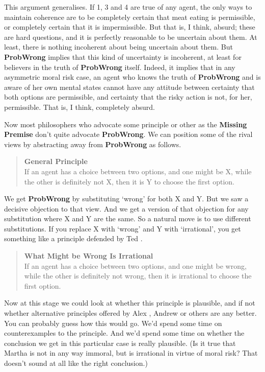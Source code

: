 This argument generalises. If 1, 3 and 4 are true of any agent, the only ways to maintain coherence are to be completely certain that meat eating is permissible, or completely certain that it is impermissible. But that is, I think, absurd; these are hard questions, and it is perfectly reasonable to be uncertain about them. At least, there is nothing incoherent about being uncertain about them. But \textbf{ProbWrong} implies that this kind of uncertainty is incoherent, at least for believers in the truth of \textbf{ProbWrong} itself. Indeed, it implies that in any asymmetric moral risk case, an agent who knows the truth of \textbf{ProbWrong} and is aware of her own mental states cannot have any attitude between certainty that both options are permissible, and certainty that the risky action is not, for her, permissible. That is, I think, completely absurd.

Now most philosophers who advocate some principle or other as the \textbf{Missing Premise} don't quite advocate \textbf{ProbWrong}. We can position some of the rival views by abstracting away from \textbf{ProbWrong} as follows.

\begin{quote}

\textbf{General Principle}\\
If an agent has a choice between two options, and one might be X, while the other is definitely not X, then it is Y to choose the first option.
\end{quote}
We get \textbf{ProbWrong} by substituting `wrong' for both X and Y. But we saw a decisive objection to that view. And we get a version of that objection for any substitution where X and Y are the same. So a natural move is to use different substitutions. If you replace X with `wrong' and Y with `irrational', you get something like a principle defended by Ted  \citet{Lockhart2000}.

\begin{quote}

\textbf{What Might be Wrong Is Irrational}\\
If an agent has a choice between two options, and one might be wrong, while the other is definitely not wrong, then it is irrational to choose the first option.
\end{quote}
Now at this stage we could look at whether this principle is plausible, and if not whether alternative principles offered by Alex  \citet{Guerrero2007}, Andrew  \citet{Sepielli2009} or others are any better. You can probably guess how this would go. We'd spend some time on counterexamples to the principle. And we'd spend some time on whether the conclusion we get in this particular case is really plausible. (Is it true that Martha is not in any way immoral, but is irrational in virtue of moral risk? That doesn't sound at all like the right conclusion.)

